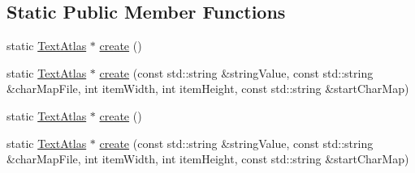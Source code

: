 \subsection*{Static Public Member Functions}
\begin{DoxyCompactItemize}
\item 
static \hyperlink{classui_1_1TextAtlas}{Text\+Atlas} $\ast$ \hyperlink{classui_1_1TextAtlas_a7b5a0b72da9062345e5bf6d5b5cf4e91}{create} ()
\item 
static \hyperlink{classui_1_1TextAtlas}{Text\+Atlas} $\ast$ \hyperlink{classui_1_1TextAtlas_aa5160936d6f48db86845d66db192ed21}{create} (const std\+::string \&string\+Value, const std\+::string \&char\+Map\+File, int item\+Width, int item\+Height, const std\+::string \&start\+Char\+Map)
\item 
static \hyperlink{classui_1_1TextAtlas}{Text\+Atlas} $\ast$ \hyperlink{classui_1_1TextAtlas_a1a5af4502868a2f50a30c17511753681}{create} ()
\item 
static \hyperlink{classui_1_1TextAtlas}{Text\+Atlas} $\ast$ \hyperlink{classui_1_1TextAtlas_a0463939d3b83c0575fe773fc79750a4d}{create} (const std\+::string \&string\+Value, const std\+::string \&char\+Map\+File, int item\+Width, int item\+Height, const std\+::string \&start\+Char\+Map)
\end{DoxyCompactItemize}
